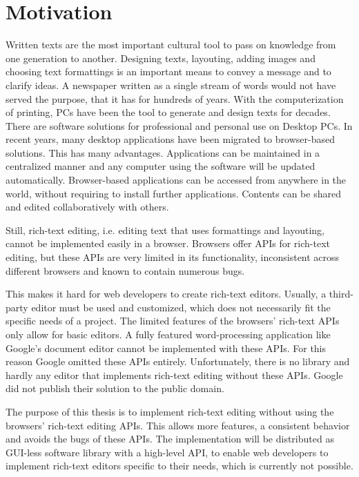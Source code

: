 \section{Motivation}

Written texts are the most important cultural tool to pass on knowledge from one generation to another. Designing texts, layouting, adding images and choosing text formattings is an important means to convey a message and to clarify ideas. A newspaper written as a single stream of words would not have served the purpose, that it has for hundreds of years.
With the computerization of printing, PCs have been the tool to generate and design texts for decades. There are software solutions for professional and personal use on Desktop PCs.
In recent years, many desktop applications have been migrated to browser-based solutions. This has many advantages. Applications can be maintained in a centralized manner and any computer using the software will be updated automatically. Browser-based applications can be accessed from anywhere in the world, without requiring to install further applications. Contents can be shared and edited collaboratively with others.

Still, rich-text editing, i.e. editing text that uses formattings and layouting, cannot be implemented easily in a browser. Browsers offer APIs for rich-text editing, but these APIs are very limited in its functionality, inconsistent across different browsers and known to contain numerous bugs.

This makes it hard for web developers to create rich-text editors. Usually, a third-party editor must be used and customized, which does not necessarily fit the specific needs of a project. The limited features of the browsers' rich-text APIs only allow for basic editors. A fully featured word-processing application like Google's document editor cannot be implemented with these APIs. For this reason Google omitted these APIs entirely. Unfortunately, there is no library and hardly any editor that implements rich-text editing without these APIs. Google did not publish their solution to the public domain.

The purpose of this thesis is to implement rich-text editing without using the browsers' rich-text editing APIs. This allows more features, a consistent behavior and avoids the bugs of these APIs. The implementation will be distributed as GUI-less software library with a high-level API, to enable web developers to implement rich-text editors specific to their needs, which is currently not possible.
